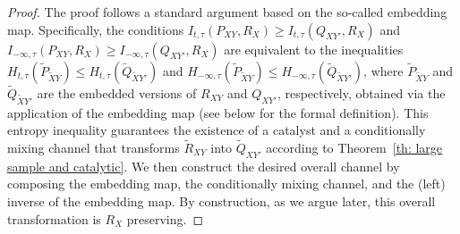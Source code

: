 \documentclass[aps,pra,11pt,onecolumn,nofootinbib,tightenlines]{revtex4-2}
\theoremstyle{definition}
\begin{document}
\begin{proof}
   The proof follows a standard argument based on the so-called embedding map. Specifically, the conditions $I_{t,\tau}(P_{XY},R_X) \geq I_{t,\tau}(Q_{XY'},R_X)$ and $I_{-\infty,\tau} (P_{XY},R_X) \geq I_{-\infty,\tau}(Q_{XY'},R_X)$ are equivalent to the inequalities $H_{t,\tau}(\widetilde{P}_{\widetilde{X}Y}) \leq H_{t,\tau}(\widetilde{Q}_{\widetilde{X}Y'})$  and $H_{-\infty,\tau}(\widetilde{P}_{\widetilde{X}Y}) \leq H_{-\infty,\tau}(\widetilde{Q}_{\widetilde{X}Y'})$, where $\widetilde{P}_{\widetilde{X}Y}$ and $\widetilde{Q}_{\widetilde{X}Y'}$ are the embedded versions of $R_{XY}$ and $Q_{XY'}$, respectively, obtained via the application of the embedding map (see below for the formal definition).
   This entropy inequality guarantees the existence of a catalyst and a conditionally mixing channel 
   that transforms $\widetilde{R}_{XY}$ into $\widetilde{Q}_{XY'}$ according to Theorem~\ref{th: large sample and catalytic}. We then construct the desired overall channel by composing the embedding map, the conditionally mixing channel, and the (left) inverse of the embedding map. By construction, as we argue later, this overall transformation is $R_X$ preserving.

\bigskip


\end{proof}
\end{document}
